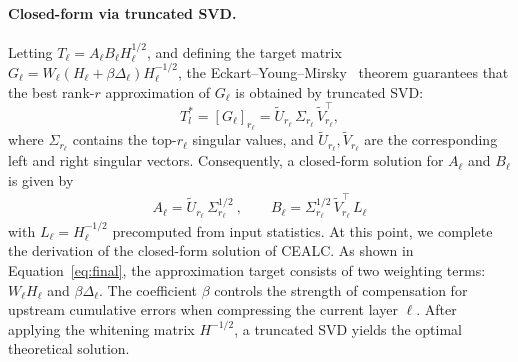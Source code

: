\paragraph{Closed-form via truncated SVD.} Letting $T_\ell = A_\ell B_\ell H_{\ell}^{1/2}$, and defining the target matrix $G_\ell=W_\ell(H_\ell+\beta \Delta_\ell)H_{\ell}^{-1/2}$, the Eckart–Young–Mirsky~\citep{Eckart1936} theorem guarantees that the best rank-$r$ approximation of $G_\ell$ is obtained by truncated SVD:
\begin{equation}
    T_l^* = [G_\ell]_{r_\ell} = \tilde{U}_{r_\ell}\,\Sigma_{r_\ell}\, \tilde{V}_{r_\ell}^\top,
        \label{eq:final svd}
\end{equation}
where $\Sigma_{r_\ell}$ contains the top-$r_\ell$ singular values, and $\tilde{U}_{r_\ell},\tilde{V}_{r_\ell}$ are the corresponding left and right singular vectors. Consequently, a closed-form solution for $A_\ell$ and $B_\ell$ is given by
\begin{align}
    A_\ell = \tilde{U}_{r_\ell}\,\Sigma_{r_\ell}^{1/2}~, \qquad B_\ell = \Sigma_{r_\ell}^{1/2}\,\tilde{V}_{r_\ell}^\top\,L_\ell
\end{align}
with $L_\ell = H_{\ell}^{-1/2}$ precomputed from input statistics. 
At this point, we complete the derivation of the closed-form solution of CEALC. As shown in Equation~\ref{eq:final}, the approximation target consists of two weighting terms: $W_{\ell}H_{\ell}$ and $\beta \Delta_{\ell}$. The coefficient $\beta$ controls the strength of compensation for upstream cumulative errors when compressing the current layer $\ell$. After applying the whitening matrix $H^{-1/2}$, a truncated SVD yields the optimal theoretical solution.

